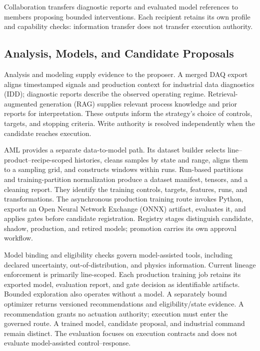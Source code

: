 Collaboration transfers diagnostic reports and evaluated model references
to members proposing bounded interventions. Each recipient retains its own
profile and capability checks: information transfer does not transfer
execution authority.

\subsection{Analysis, Models, and Candidate Proposals}
Analysis and modeling supply evidence to the proposer. A merged DAQ export
aligns timestamped signals and production context for industrial data
diagnostics (IDD); diagnostic reports describe the observed operating
regime. Retrieval-augmented generation (RAG) supplies relevant process
knowledge and prior reports for interpretation. These outputs inform the
strategy's choice of controls, targets, and stopping criteria. Write
authority is resolved independently when the candidate reaches execution.

AML provides a separate data-to-model path. Its dataset builder selects
line--product--recipe-scoped histories, cleans samples by state and range,
aligns them to a sampling grid, and constructs windows within runs.
Run-based partitions and training-partition normalization produce a
dataset manifest, tensors, and a cleaning report. They identify the training
controls, targets, features, runs, and transformations. The asynchronous
production training route invokes Python,
exports an Open Neural Network Exchange (ONNX) artifact, evaluates it, and
applies gates before candidate registration. Registry stages distinguish
candidate, shadow, production, and retired models; promotion carries its
own approval workflow.

Model binding and eligibility checks govern model-assisted tools, including
declared uncertainty, out-of-distribution, and physics information. Current
lineage enforcement is primarily line-scoped. Each production training job
retains its exported model, evaluation report, and gate decision as
identifiable artifacts. Bounded exploration also operates without a model.
A separately bound optimizer returns versioned recommendations and
eligibility/state evidence. A recommendation grants no actuation authority;
execution must enter the governed route.
A trained model, candidate proposal, and industrial command remain distinct.
The evaluation focuses on execution contracts and does not evaluate
model-assisted control--response.

